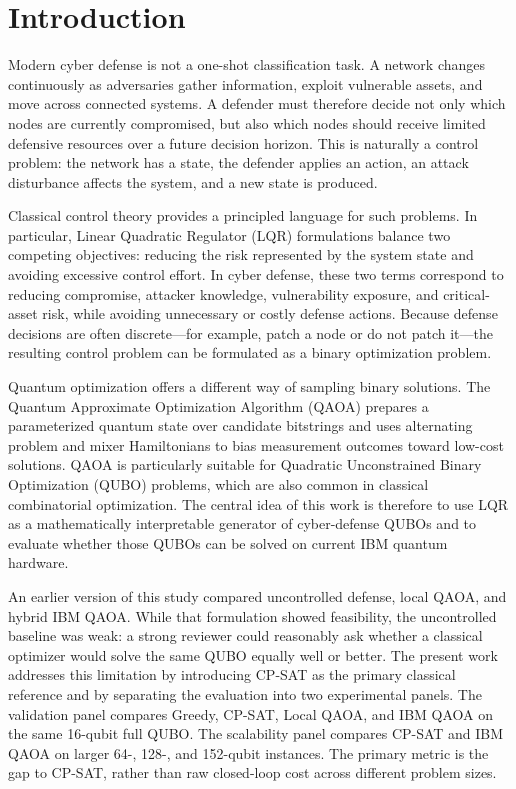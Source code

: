 \documentclass[runningheads]{llncs}
\begin{document}
\section{Introduction}

Modern cyber defense is not a one-shot classification task. A network changes continuously as adversaries gather information, exploit vulnerable assets, and move across connected systems. A defender must therefore decide not only which nodes are currently compromised, but also which nodes should receive limited defensive resources over a future decision horizon. This is naturally a control problem: the network has a state, the defender applies an action, an attack disturbance affects the system, and a new state is produced.

Classical control theory provides a principled language for such problems. In particular, Linear Quadratic Regulator (LQR) formulations balance two competing objectives: reducing the risk represented by the system state and avoiding excessive control effort. In cyber defense, these two terms correspond to reducing compromise, attacker knowledge, vulnerability exposure, and critical-asset risk, while avoiding unnecessary or costly defense actions. Because defense decisions are often discrete---for example, patch a node or do not patch it---the resulting control problem can be formulated as a binary optimization problem.

Quantum optimization offers a different way of sampling binary solutions. The Quantum Approximate Optimization Algorithm (QAOA) prepares a parameterized quantum state over candidate bitstrings and uses alternating problem and mixer Hamiltonians to bias measurement outcomes toward low-cost solutions. QAOA is particularly suitable for Quadratic Unconstrained Binary Optimization (QUBO) problems, which are also common in classical combinatorial optimization. The central idea of this work is therefore to use LQR as a mathematically interpretable generator of cyber-defense QUBOs and to evaluate whether those QUBOs can be solved on current IBM quantum hardware.

An earlier version of this study compared uncontrolled defense, local QAOA, and hybrid IBM QAOA. While that formulation showed feasibility, the uncontrolled baseline was weak: a strong reviewer could reasonably ask whether a classical optimizer would solve the same QUBO equally well or better. The present work addresses this limitation by introducing CP-SAT as the primary classical reference and by separating the evaluation into two experimental panels. The validation panel compares Greedy, CP-SAT, Local QAOA, and IBM QAOA on the same 16-qubit full QUBO. The scalability panel compares CP-SAT and IBM QAOA on larger 64-, 128-, and 152-qubit instances. The primary metric is the gap to CP-SAT, rather than raw closed-loop cost across different problem sizes.
\end{document}
